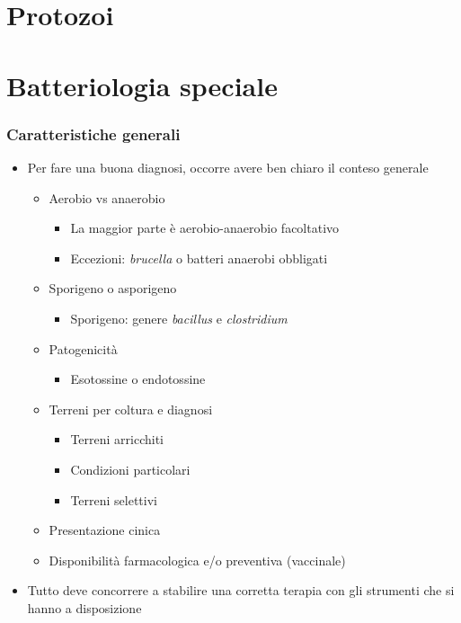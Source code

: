 \documentclass[italian,]{article}
\providecommand{\tightlist}{%
  \setlength{\itemsep}{0pt}\setlength{\parskip}{0pt}}
\begin{document}
\clearpage
\part{Protozoi}

\clearpage
\part{Batteriologia speciale}

\hypertarget{caratteristiche-generali-1}{%
\section{Caratteristiche generali}\label{caratteristiche-generali-1}}

\begin{itemize}
\tightlist
\item
  Per fare una buona diagnosi, occorre avere ben chiaro il conteso
  generale

  \begin{itemize}
  \tightlist
  \item
    Aerobio vs anaerobio

    \begin{itemize}
    \tightlist
    \item
      La maggior parte è aerobio-anaerobio facoltativo
    \item
      Eccezioni: \emph{brucella} o batteri anaerobi obbligati
    \end{itemize}
  \item
    Sporigeno o asporigeno

    \begin{itemize}
    \tightlist
    \item
      Sporigeno: genere \emph{bacillus} e \emph{clostridium}
    \end{itemize}
  \item
    Patogenicità

    \begin{itemize}
    \tightlist
    \item
      Esotossine o endotossine
    \end{itemize}
  \item
    Terreni per coltura e diagnosi

    \begin{itemize}
    \tightlist
    \item
      Terreni arricchiti
    \item
      Condizioni particolari
    \item
      Terreni selettivi
    \end{itemize}
  \item
    Presentazione cinica
  \item
    Disponibilità farmacologica e/o preventiva (vaccinale)
  \end{itemize}
\item
  Tutto deve concorrere a stabilire una corretta terapia con gli
  strumenti che si hanno a disposizione
\end{itemize}
\end{document}
